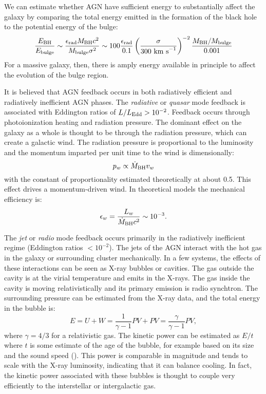 We can estimate whether AGN have sufficient energy to substantially
affect the galaxy by comparing the total energy emitted in the
formation of the black hole to the potential energy of the bulge:
\begin{equation}
\frac{E_{\rm BH}}{E_{\rm bulge}} \sim \frac{\epsilon_{\rm rad} M_{\rm BH}
c^2}{M_{\rm bulge} \sigma^2} \sim 100 \frac{\epsilon_{\rm
rad}}{0.1} \left(\frac{\sigma}{300 {\rm
~km~s}^{-1}}\right)^{-2} \frac{M_{\rm BH}/M_{\rm bulge}}{0.001}
\end{equation}
For a massive galaxy, then, there is amply energy available in
principle to affect the evolution of the bulge region.

It is believed that AGN feedback occurs in both radiatively efficient
and radiatively inefficient AGN phases. The {\it radiative} or {\it
quasar} mode feedback is associated with Eddington ratios of $L/L_{\rm
Edd} > 10^{-2}$. Feedback occurs through photoionization heating and
radiation pressure. The dominant effect on the galaxy as a whole is
thought to be through the radiation pressure, which can create a
galactic wind. The radiation pressure is proportional to the
luminosity and the momentum imparted per unit time to the wind is
dimensionally:
\begin{equation}
p_w \propto {\dot M}_{\rm BH}  v_w
\end{equation}
with the constant of proportionality estimated theoretically at about
0.5. This effect drives a momentum-driven wind. In theoretical models
the mechanical efficiency is:
\begin{equation}
\epsilon_w = \frac{L_w}{{\dot M}_{\rm BH} c^2} \sim 10^{-3}.
\end{equation}

The {\it jet} or {\it radio} mode feedback occurs primarily in the
radiatively inefficient regime (Eddington ratios $<10^{-2}$). The jets
of the AGN interact with the hot gas in the galaxy or surrounding
cluster mechanically. In a few systems, the effects of these
interactions can be seen as X-ray bubbles or cavities. The gas outside
the cavity is at the virial temperature and emits in the X-rays. The
gas inside the cavity is moving relativistically and its primary
emission is radio synchtron. The surrounding pressure can be estimated
from the X-ray data, and the total energy in the bubble is:
\begin{equation}
E = U + W = \frac{1}{\gamma - 1} PV + PV = \frac{\gamma}{\gamma - 1} PV,
\end{equation}
where $\gamma = 4/3$ for a relativistic gas. The kinetic power can be
estimated as $E/t$ where $t$ is some estimate of the age of the
bubble, for example based on its size and the sound speed
(\citealt{fabian12a}). This power is comparable in magnitude and tends
to scale with the X-ray luminosity, indicating that it can balance
cooling. In fact, the kinetic power associated with these bubbles is
thought to couple very efficiently to the interstellar or
intergalactic gas.

